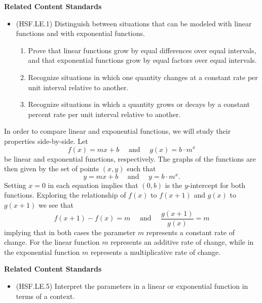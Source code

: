 \documentclass[
]{book}
\providecommand{\tightlist}{%
  \setlength{\itemsep}{0pt}\setlength{\parskip}{0pt}}
\newenvironment{standards}{}{}
\theoremstyle{definition}
\theoremstyle{definition}
\theoremstyle{definition}
\theoremstyle{definition}
\theoremstyle{remark}
\begin{document}
\begin{standards}

\begin{center}
\textbf{Related Content Standards}

\end{center}

\begin{itemize}
\tightlist
\item
  (HSF.LE.1) Distinguish between situations that can be modeled with linear functions and with exponential functions.

  \begin{enumerate}
  \def\labelenumi{\alph{enumi}.}
  \tightlist
  \item
    Prove that linear functions grow by equal differences over equal intervals, and that exponential functions grow by equal factors over equal intervals.
  \item
    Recognize situations in which one quantity changes at a constant rate per unit interval relative to another.
  \item
    Recognize situations in which a quantity grows or decays by a constant percent rate per unit interval relative to another.
  \end{enumerate}
\end{itemize}

\end{standards}

In order to compare linear and exponential functions, we will study their properties side-by-side. Let
\[f(x)=mx+b \quad \mbox{ and } \quad g(x)=b\cdot m^x\] be linear and exponential functions, respectively. The graphs of the functions are then given by the set of points \((x,y)\) such that
\[y=mx+b \quad \mbox{ and } \quad y=b\cdot m^x.\] Setting \(x=0\) in each equation implies that \((0,b)\) is the \(y\)-intercept for both functions. Exploring the relationship of \(f(x)\) to \(f(x+1)\) and \(g(x)\) to \(g(x+1)\) we see that \[f(x+1)-f(x) = m \quad \mbox{ and } \quad \frac{g(x+1)}{g(x)} = m\] implying that in both cases the parameter \(m\) represents a constant rate of change. For the linear function \(m\) represents an additive rate of change, while in the exponential function \(m\) represents a multiplicative rate of change.

\begin{standards}

\begin{center}
\textbf{Related Content Standards}

\end{center}

\begin{itemize}
\tightlist
\item
  (HSF.LE.5) Interpret the parameters in a linear or exponential function in terms of a context.
\end{itemize}

\end{standards}
\end{document}
